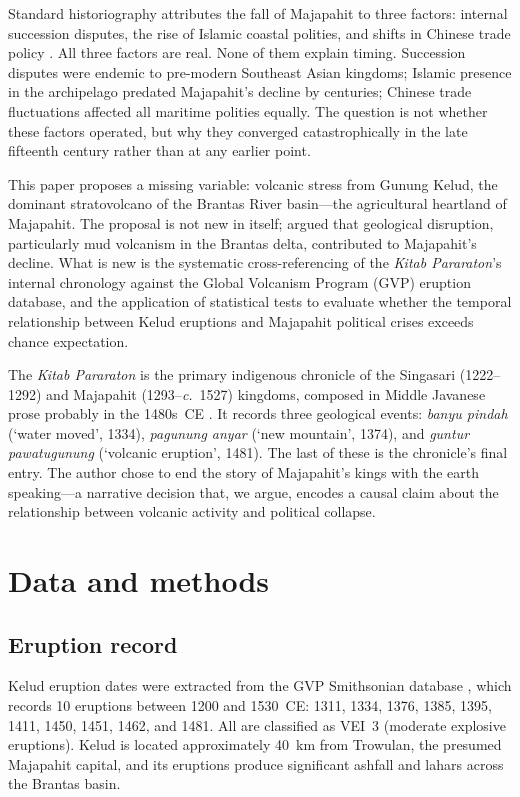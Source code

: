 \documentclass[12pt,a4paper]{article}
\begin{document}
Standard historiography attributes the fall of Majapahit to three factors: internal succession disputes, the rise of Islamic coastal polities, and shifts in Chinese trade policy \citep{ricklefs2001,reid1993}.
All three factors are real.
None of them explain timing.
Succession disputes were endemic to pre-modern Southeast Asian kingdoms; Islamic presence in the archipelago predated Majapahit's decline by centuries; Chinese trade fluctuations affected all maritime polities equally.
The question is not whether these factors operated, but why they converged catastrophically in the late fifteenth century rather than at any earlier point.

This paper proposes a missing variable: volcanic stress from Gunung Kelud, the dominant stratovolcano of the Brantas River basin---the agricultural heartland of Majapahit.
The proposal is not new in itself; \citet{satyana2015} argued that geological disruption, particularly mud volcanism in the Brantas delta, contributed to Majapahit's decline.
What is new is the systematic cross-referencing of the \textit{Kitab Pararaton}'s internal chronology against the Global Volcanism Program (GVP) eruption database, and the application of statistical tests to evaluate whether the temporal relationship between Kelud eruptions and Majapahit political crises exceeds chance expectation.

The \textit{Kitab Pararaton} is the primary indigenous chronicle of the Singasari (1222--1292) and Majapahit (1293--\textit{c.}~1527) kingdoms, composed in Middle Javanese prose probably in the 1480s~CE \citep{brandes1896,pigeaud1967}.
It records three geological events: \textit{banyu pindah} (`water moved', 1334), \textit{pagunung anyar} (`new mountain', 1374), and \textit{guntur pawatugunung} (`volcanic eruption', 1481).
The last of these is the chronicle's final entry.
The author chose to end the story of Majapahit's kings with the earth speaking---a narrative decision that, we argue, encodes a causal claim about the relationship between volcanic activity and political collapse.

\section{Data and methods}

\subsection{Eruption record}

Kelud eruption dates were extracted from the GVP Smithsonian database \citep{gvp2024}, which records 10 eruptions between 1200 and 1530~CE: 1311, 1334, 1376, 1385, 1395, 1411, 1450, 1451, 1462, and 1481.
All are classified as VEI~3 (moderate explosive eruptions).
Kelud is located approximately 40~km from Trowulan, the presumed Majapahit capital, and its eruptions produce significant ashfall and lahars across the Brantas basin.
\end{document}
